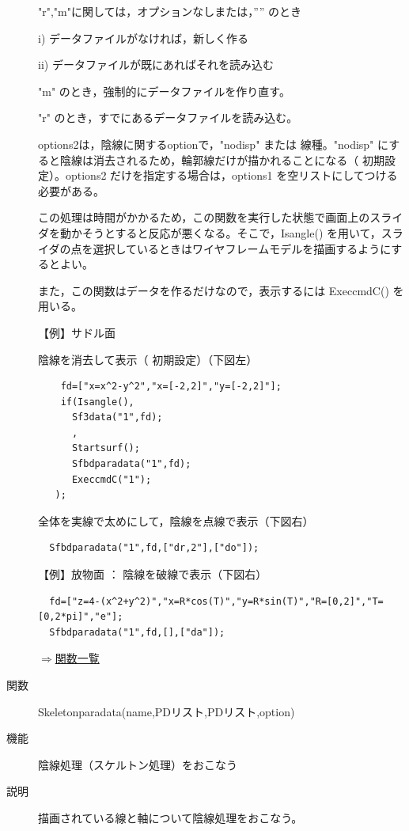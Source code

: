 \documentclass[papersize,a4paper,12pt,uplatex]{jsarticle}
\begin{document}
\begin{description}
 "r","m"に関しては，オプションなしまたは，”” のとき
 
  i) データファイルがなければ，新しく作る
  
  ii) データファイルが既にあればそれを読み込む
  
"m"  のとき，強制的にデータファイルを作り直す。

"r" のとき，すでにあるデータファイルを読み込む。

options2は，陰線に関するoptionで，"nodisp" または 線種。"nodisp" にすると陰線は消去されるため，輪郭線だけが描かれることになる（ 初期設定）。options2 だけを指定する場合は，options1 を空リストにしてつける必要がある。

この処理は時間がかかるため，この関数を実行した状態で画面上のスライダを動かそうとすると反応が悪くなる。そこで，Isangle() を用いて，スライダの点を選択しているときはワイヤフレームモデルを描画するようにするとよい。

また，この関数はデータを作るだけなので，表示するには ExeccmdC() を用いる。

\vspace{\baselineskip}
【例】サドル面

陰線を消去して表示（ 初期設定）（下図左）
\begin{verbatim}
    fd=["x=x^2-y^2","x=[-2,2]","y=[-2,2]"];
    if(Isangle(),
      Sf3data("1",fd);
      ,
      Startsurf();
      Sfbdparadata("1",fd);
      ExeccmdC("1");
   );
\end{verbatim}
全体を実線で太めにして，陰線を点線で表示（下図右）
\begin{verbatim}
  Sfbdparadata("1",fd,["dr,2"],["do"]);
\end{verbatim}
      \begin{center}     \end{center}

【例】放物面  ：  陰線を破線で表示（下図右）
\begin{verbatim}
  fd=["z=4-(x^2+y^2)","x=R*cos(T)","y=R*sin(T)","R=[0,2]","T=[0,2*pi]","e"];
  Sfbdparadata("1",fd,[],["da"]);
\end{verbatim}
      \begin{center}    \end{center}


\begin{flushright} \hyperlink{functionlist}{$\Rightarrow$関数一覧}\end{flushright}

\hypertarget{skeletonparadata}{}
\item[関数]  Skeletonparadata(name,PDリスト,PDリスト,option)
\item[機能]  陰線処理（スケルトン処理）をおこなう
\item[説明]  描画されている線と軸について陰線処理をおこなう。


\end{description}
\end{document}
